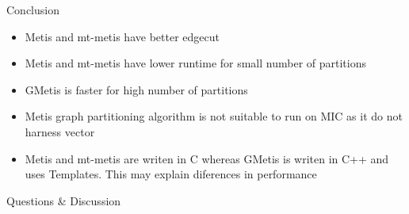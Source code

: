 \documentclass{beamer}
\begin{document}
\begin{frame}{Conclusion}
\begin{itemize}
  \item Metis and mt-metis have better edgecut
  \item Metis and mt-metis have lower runtime for small number of
    partitions
  \item GMetis is faster for high number of partitions
  \item Metis graph partitioning algorithm is not suitable to run on MIC
    as it do not harness vector
  \item Metis and mt-metis are writen in C whereas GMetis is writen in
    C++ and uses Templates. This may explain diferences in performance
\end{itemize}
\end{frame}



\begin{frame}
  \titlepage
  \begin{center}
  \huge Questions \& Discussion
  \end{center}
\end{frame}
\end{document}
